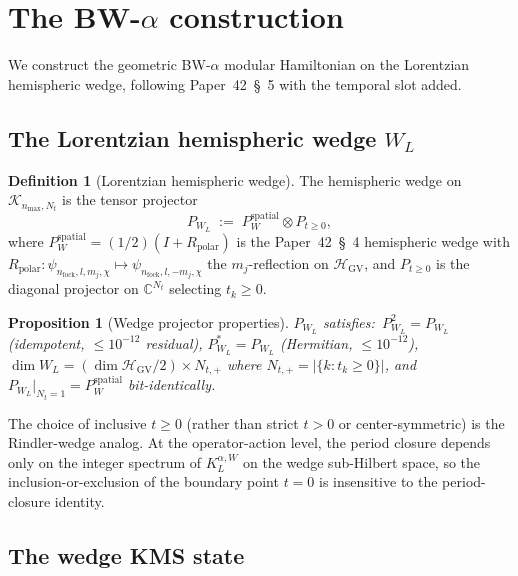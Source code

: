 \documentclass[11pt,a4paper]{article}
\theoremstyle{plain}
\newtheorem{proposition}[theorem]{Proposition}
\theoremstyle{definition}
\newtheorem{definition}[theorem]{Definition}
\newcommand{\nmax}{n_{\max}}
\newcommand{\Nt}{N_t}
\newcommand{\Hilb}{\mathcal{H}}
\newcommand{\Krein}{\mathcal{K}}
\newcommand{\C}{\mathbb{C}}
\newcommand{\KL}{K_{L}}
\begin{document}
\section{The BW-$\alpha$ construction}\label{sec:bw_alpha}

We construct the geometric BW-$\alpha$ modular Hamiltonian on the
Lorentzian hemispheric wedge, following Paper~42~\S~5 with the
temporal slot added.

\subsection{The Lorentzian hemispheric wedge $W_L$}\label{sec:wedge}

\begin{definition}[Lorentzian hemispheric wedge]\label{def:wedge_L}
The hemispheric wedge on $\Krein_{\nmax, \Nt}$ is the tensor projector
\begin{equation}\label{eq:P_WL}
   P_{W_L}
   \;:=\; P_W^{\mathrm{spatial}} \otimes P_{t \ge 0},
\end{equation}
where $P_W^{\mathrm{spatial}} = (1/2)(I + R_{\mathrm{polar}})$ is the
Paper~42~\S~4 hemispheric wedge with $R_{\mathrm{polar}}:
\psi_{n_\text{fock}, l, m_j, \chi} \mapsto \psi_{n_\text{fock}, l, -m_j,
\chi}$ the $m_j$-reflection on $\Hilb_{\mathrm{GV}}$, and $P_{t \ge 0}$
is the diagonal projector on $\C^{\Nt}$ selecting $t_k \ge 0$.
\end{definition}

\begin{proposition}[Wedge projector properties]\label{prop:wedge_properties}
$P_{W_L}$ satisfies:\
$P_{W_L}^2 = P_{W_L}$ (idempotent, $\le 10^{-12}$ residual),
$P_{W_L}^* = P_{W_L}$ (Hermitian, $\le 10^{-12}$),
$\dim W_L = (\dim \Hilb_{\mathrm{GV}}/2) \times N_{t, +}$ where
$N_{t, +} = |\{k : t_k \ge 0\}|$, and
$P_{W_L}\big|_{\Nt = 1} = P_W^{\mathrm{spatial}}$ bit-identically.
\end{proposition}

The choice of inclusive $t \ge 0$ (rather than strict $t > 0$ or
center-symmetric) is the Rindler-wedge analog. At the
operator-action level, the period closure depends only on the
integer spectrum of $\KL^{\alpha, W}$ on the wedge sub-Hilbert space,
so the inclusion-or-exclusion of the boundary point $t = 0$ is
insensitive to the period-closure identity.

\subsection{The wedge KMS state}\label{sec:KMS_state}
\end{document}
